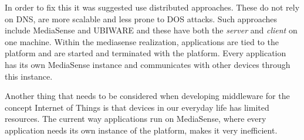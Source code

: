 In order to fix this it was suggested use distributed approaches. These do not rely on DNS, are more scalable and less prone to DOS attacks. Such approaches include MediaSense \cite{Kanter539187} and UBIWARE \cite{osterle2010memorandum} and these have both the \emph{server} and \emph{client} on one machine. Within the mediasense realization, applications are tied to the platform and are started and terminated with the platform. Every application has its own MediaSense instance and communicates with other devices through this instance.

Another thing that needs to be considered when developing middleware for the concept Internet of Things is that devices in our everyday life has limited resources. The current way applications run on MediaSense, where every application needs its own instance of the platform, makes it very inefficient.